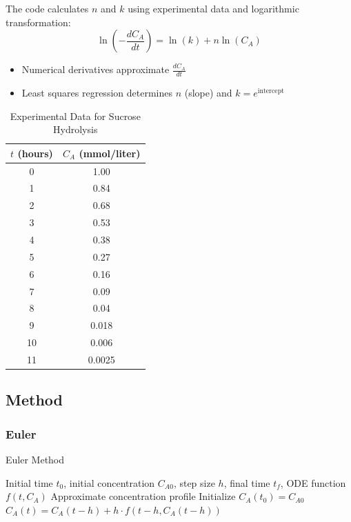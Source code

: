 \documentclass[10pt]{article}
\begin{document}
The code calculates \( n \) and \( k \) using experimental data and logarithmic transformation:
\begin{equation}
    \ln(-\frac{dC_A}{dt}) = \ln(k) + n\ln(C_A)
\end{equation}
\begin{itemize}
    \item Numerical derivatives approximate \(\frac{dC_A}{dt}\)
    \item Least squares regression determines \( n \) (slope) and \( k = e^{\text{intercept}} \)
\end{itemize}
\begin{table}[H]
\centering
\caption{Experimental Data for Sucrose Hydrolysis}
\begin{tabular}{cc}
\toprule
\( t \) (hours) & \( C_A \) (mmol/liter) \\
\midrule
0 & 1.00 \\
1 & 0.84 \\
2 & 0.68 \\
3 & 0.53 \\
4 & 0.38 \\
5 & 0.27 \\
6 & 0.16 \\
7 & 0.09 \\
8 & 0.04 \\
9 & 0.018 \\
10 & 0.006 \\
11 & 0.0025 \\
\bottomrule
\end{tabular}
\end{table}

\subsection{Method}
\subsubsection{Euler}

\begin{algorithm}[H]
\caption{Euler Method}
\begin{algorithmic}[1]
\Require Initial time \( t_0 \), initial concentration \( C_{A0} \), step size \( h \), final time \( t_f \), ODE function \( f(t, C_A) \)
\Ensure Approximate concentration profile
\State Initialize \( C_A(t_0) = C_{A0} \)
    \State \( C_A(t) = C_A(t - h) + h \cdot f(t - h, C_A(t - h)) \)
\EndFor
\end{algorithmic}
\end{algorithm}
\end{document}
